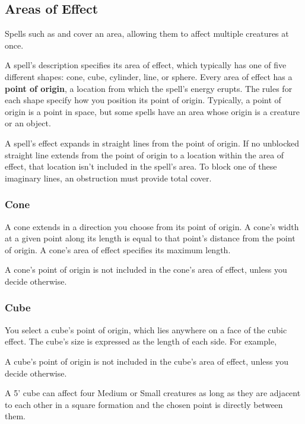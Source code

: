 \subsection{Areas of Effect}\label{subsec:areas-of-effect}

Spells such as  and  cover an area, allowing them to affect multiple creatures at once.

A spell's description specifies its area of effect, which typically has one of five different shapes: cone, cube, cylinder, line, or sphere. Every area of effect has a \textbf{point of origin}, a location from which the spell's energy erupts. The rules for each shape specify how you position its point of origin. Typically, a point of origin is a point in space, but some spells have an area whose origin is a creature or an object.

A spell's effect expands in straight lines from the point of origin. If no unblocked straight line extends from the point of origin to a location within the area of effect, that location isn't included in the spell's area. To block one of these imaginary lines, an obstruction must provide total cover.

\subsubsection{Cone}

A cone extends in a direction you choose from its point of origin. A cone's width at a given point along its length is equal to that point's distance from the point of origin. A cone's area of effect specifies its maximum length.

A cone's point of origin is not included in the cone's area of effect, unless you decide otherwise.

\subsubsection{Cube}

You select a cube's point of origin, which lies anywhere on a face of the cubic effect. The cube's size is expressed as the length of each side. For example, 

A cube's point of origin is not included in the cube's area of effect, unless you decide otherwise.

A 5' cube can affect four Medium or Small creatures as long as they are adjacent to each other in a square formation and the chosen point is directly between them.

